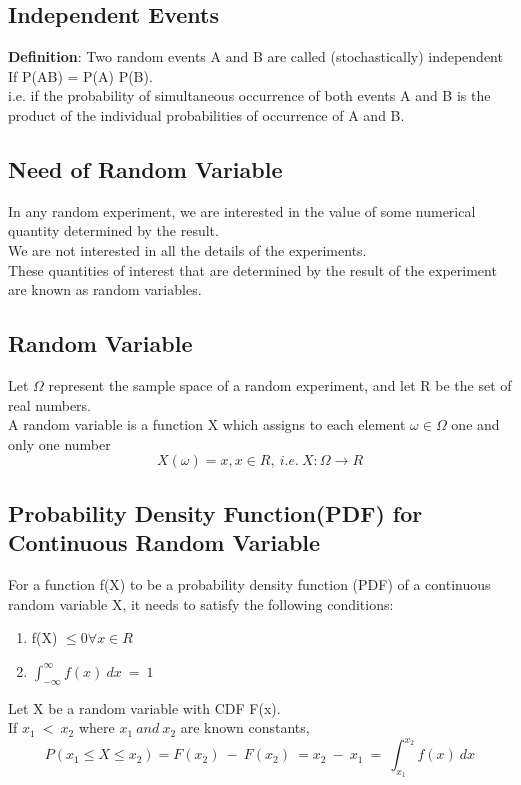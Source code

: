 \subsection*{Independent Events}
\textbf{Definition}: Two random events A and B are called (stochastically)
independent If P(AB) = P(A) P(B).\\
i.e. if the probability of simultaneous occurrence of both events A
and B is the product of the individual probabilities of occurrence of A
and B.

\subsection*{Need of Random Variable}
In any random experiment, we are interested in the value of some
numerical quantity determined by the result.\\
We are not interested in all the details of the experiments.\\
These quantities of interest that are determined by the result of the
experiment are known as random variables.

\subsection*{Random Variable}
Let $\Omega$ represent the sample space of a random experiment, and
let R be the set of real numbers.\\
A random variable is a function X which assigns to each element
$\omega \in \Omega$ one and only one number
\[ X(\omega) = x, x \in R,\ i.e.\ X : \Omega \rightarrow R \]

\subsection*{Probability Density Function(PDF) for Continuous Random Variable}
For a function f(X) to be a probability density function (PDF) of a
continuous random variable X, it needs to satisfy the following
conditions:
\begin{enumerate}
    \item f(X) $\leq 0 \forall x \in R$ 
    \item $\int_{-\infty}^{\infty}f(x)\ dx \ = \ 1$
\end{enumerate}
Let X be a random variable with CDF F(x).\\
If $x_1\ <\ x_2$ where $x_1\ and\ x_2$ are known constants,
\[ P(x_1 \leq X \leq x_2) = F(x_2)\ -\ F(x_2)\ = x_2\ -\ x_1\ =\ \int_{x_1}^{x_2}f(x)\ dx\]


